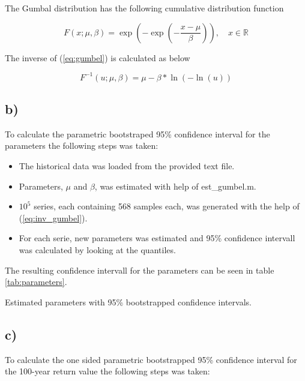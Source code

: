 \documentclass[a4paper]{article}
\begin{document}
The Gumbal distribution has the following cumulative distribution function

\begin{equation}
    F(x; \mu, \beta) = \exp\left(-\exp\left(-\frac{x-\mu}{\beta}\right)\right), \quad x \in \mathbb{R}
    \label{eq:gumbel}
\end{equation}

The inverse of (\ref{eq:gumbel}) is calculated as below

\begin{equation}
    F^{-1}(u; \mu, \beta) = \mu - \beta*\ln(-\ln(u))
    \label{eq:inv_gumbel}
\end{equation}

\subsection*{b)}

To calculate the parametric bootstraped 95\% confidence interval for the parameters the following steps was taken:

\begin{itemize}
    \item The historical data was loaded from the provided text file.
    \item Parameters, $\mu$ and $\beta$, was estimated with help of est\_gumbel.m.
    \item $10^5$ series, each containing 568 samples each, was generated with the help of (\ref{eq:inv_gumbel}).
    \item For each serie, new parameters was estimated and 95\% confidence intervall was calculated by looking at the quantiles.
\end{itemize}

The resulting confidence intervall for the parameters can be seen in table \ref{tab:parameters}.

\begin{table}[H]
    \centering
    \caption{Estimated parameters with 95\% bootstrapped confidence intervals.}
    \label{tab:parameters}
    
\end{table}

\subsection*{c)}

To calculate the one sided parametric bootstrapped 95\% confidence interval for the 100-year return value the following steps was taken:
\end{document}
